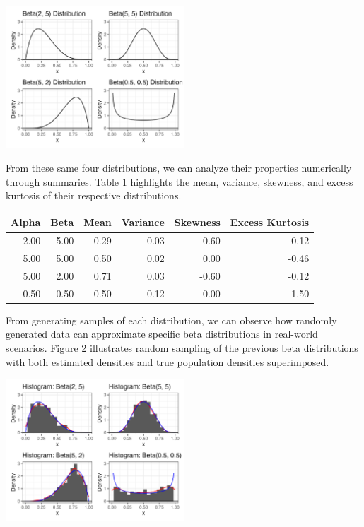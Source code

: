 \documentclass{article}\usepackage[]{graphicx}\usepackage[]{xcolor}
\newenvironment{Figure}
  {\par\medskip\noindent\minipage{\linewidth}}
  {\endminipage\par\medskip}
\begin{document}
\begin{multicols}{2}
\begin{Figure}
\begin{center}
  \includegraphics[width=0.5\textwidth]{task1.png}
\end{center}
\end{Figure}

From these same four distributions, we can analyze their properties numerically through summaries. Table 1 highlights the mean, variance, skewness, and excess kurtosis of their respective distributions.

\begin{Figure}
\centering
\scriptsize
\begin{tabular}{rrrrrr}
  \hline
 Alpha & Beta & Mean & Variance & Skewness & Excess Kurtosis \\ 
  \hline
2.00 & 5.00 & 0.29 & 0.03 & 0.60 & -0.12 \\ 
5.00 & 5.00 & 0.50 & 0.02 & 0.00 & -0.46 \\ 
5.00 & 2.00 & 0.71 & 0.03 & -0.60 & -0.12 \\ 
0.50 & 0.50 & 0.50 & 0.12 & 0.00 & -1.50 \\ 
   \hline
\end{tabular}
\end{Figure}

From generating samples of each distribution, we can observe how randomly generated data can approximate specific beta distributions in real-world scenarios. Figure 2 illustrates random sampling of the previous beta distributions with both estimated densities and true population densities superimposed.

\begin{Figure}
\begin{center}
  \includegraphics[width=0.5\textwidth]{task3.png}
\end{center} 
\end{Figure}


\end{multicols}
\end{document}
